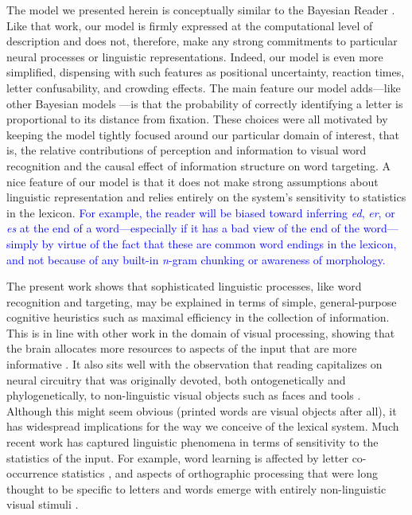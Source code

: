 \documentclass[doc,biblatex]{apa7}
\newcommand\newmaterial[1]{\textcolor{blue}{#1}}
\begin{document}
The model we presented herein is conceptually similar to the Bayesian Reader \parencite{Norris:2006, Norris:2009, Norris:2012}. Like that work, our model is firmly expressed at the computational level of description \parencite{Marr:1982} and does not, therefore, make any strong commitments to particular neural processes or linguistic representations. Indeed, our model is even more simplified, dispensing with such features as positional uncertainty, reaction times, letter confusability, and crowding effects. The main feature our model adds---like other Bayesian models \parencite{SmithChan:2010, Bicknell:2012, Valdois:2021}---is that the probability of correctly identifying a letter is proportional to its distance from fixation. These choices were all motivated by keeping the model tightly focused around our particular domain of interest, that is, the relative contributions of perception and information to visual word recognition and the causal effect of information structure on word targeting. A nice feature of our model is that it does not make strong assumptions about linguistic representation and relies entirely on the system's sensitivity to statistics in the lexicon. \newmaterial{For example, the reader will be biased toward inferring \textit{ed}, \textit{er}, or \textit{es} at the end of a word---especially if it has a bad view of the end of the word---simply by virtue of the fact that these are common word endings in the lexicon, and not because of any built-in \textit{n}-gram chunking or awareness of morphology.}

The present work shows that sophisticated linguistic processes, like word recognition and targeting, may be explained in terms of simple, general-purpose cognitive heuristics such as maximal efficiency in the collection of information. This is in line with other work in the domain of visual processing, showing that the brain allocates more resources to aspects of the input that are more informative \parencite{Simoncelli:2001, Hermundstad:2014}. It also sits well with the observation that reading capitalizes on neural circuitry that was originally devoted, both ontogenetically and phylogenetically, to non-linguistic visual objects such as faces and tools \parencite{Dehaene:2011, Hervais:2019}. Although this might seem obvious (printed words are visual objects after all), it has widespread implications for the way we conceive of the lexical system. Much recent work has captured linguistic phenomena in terms of sensitivity to the statistics of the input. For example, word learning is affected by letter co-occurrence statistics \parencite{Chetail:2017, Lelonkiewicz:2020}, and aspects of orthographic processing that were long thought to be specific to letters and words emerge with entirely non-linguistic visual stimuli \parencite{Vidal:2021}.
\end{document}

